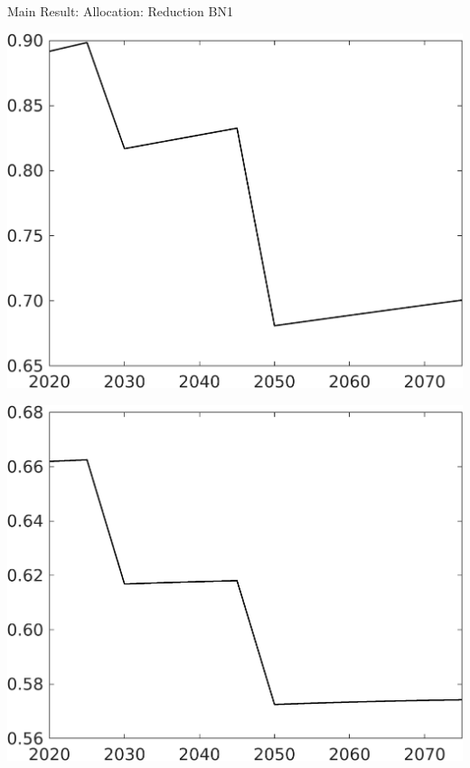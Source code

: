 \documentclass[11pt,aspectratio=169]{beamer}
\begin{document}
\begin{frame}{Main Result: Allocation: Reduction BN1}
	\centering
	\begin{minipage}[]{0.32\textwidth}
		\includegraphics[width=1\textwidth]{../codding_model/own_basedOnFried/optimalPol_elastS_DisuSci/figures/all_1705/Single_OPT_T_NoTaus_C_spillover0_sep1_BN1_ineq0_red0_etaa0.79.png}
	\end{minipage}
	\begin{minipage}[]{0.32\textwidth}
		\includegraphics[width=1\textwidth]{../codding_model/own_basedOnFried/optimalPol_elastS_DisuSci/figures/all_1705/Single_OPT_T_NoTaus_hh_spillover0_sep1_BN1_ineq0_red0_etaa0.79.png}

\end{minipage}
\end{frame}
\end{document}
